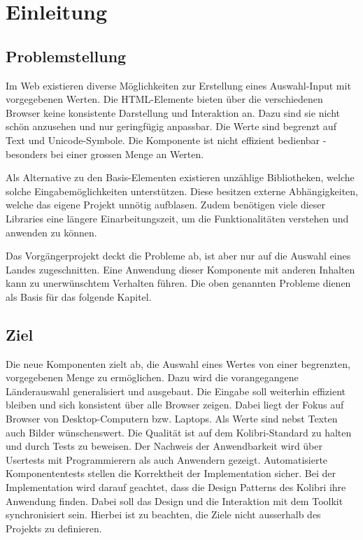\chapter{Einleitung}
\label{chap:intro}


\section{Problemstellung}
\label{sec:problem}

Im Web existieren diverse Möglichkeiten zur Erstellung eines Auswahl-Input mit vorgegebenen Werten.
Die HTML-Elemente bieten über die verschiedenen Browser keine konsistente Darstellung und Interaktion an.
Dazu sind sie nicht schön anzusehen und nur geringfügig anpassbar. 
Die Werte sind begrenzt auf Text und Unicode-Symbole.
Die Komponente ist nicht effizient bedienbar - besonders bei einer grossen Menge an Werten.

Als Alternative zu den Basis-Elementen existieren unzählige Bibliotheken, welche solche Eingabemöglichkeiten unterstützen.
Diese besitzen externe Abhängigkeiten, welche das eigene Projekt unnötig aufblasen.
Zudem benötigen viele dieser Libraries eine längere Einarbeitungszeit, um die Funktionalitäten verstehen und anwenden zu können.

Das Vorgängerprojekt deckt die Probleme ab, ist aber nur auf die Auswahl eines Landes zugeschnitten.
Eine Anwendung dieser Komponente mit anderen Inhalten kann zu unerwünschtem Verhalten führen.
Die oben genannten Probleme dienen als Basis für das folgende Kapitel.


\section{Ziel}
\label{sec:goal}

Die neue Komponenten zielt ab, die Auswahl eines Wertes von einer begrenzten, vorgegebenen Menge zu ermöglichen.
Dazu wird die vorangegangene Länderauswahl generalisiert und ausgebaut.
Die Eingabe soll weiterhin effizient bleiben und sich konsistent über alle Browser zeigen.
Dabei liegt der Fokus auf Browser von Desktop-Computern bzw. Laptops.
Als Werte sind nebst Texten auch Bilder wünschenswert.
Die Qualität ist auf dem Kolibri-Standard zu halten und durch Tests zu beweisen.
Der Nachweis der Anwendbarkeit wird über Usertests mit Programmierern als auch Anwendern gezeigt.
Automatisierte Komponententests stellen die Korrektheit der Implementation sicher.
Bei der Implementation wird darauf geachtet, dass die Design Patterns des Kolibri ihre Anwendung finden.
Dabei soll das Design und die Interaktion mit dem Toolkit synchronisiert sein.
Hierbei ist zu beachten, die Ziele nicht ausserhalb des Projekts zu definieren.


